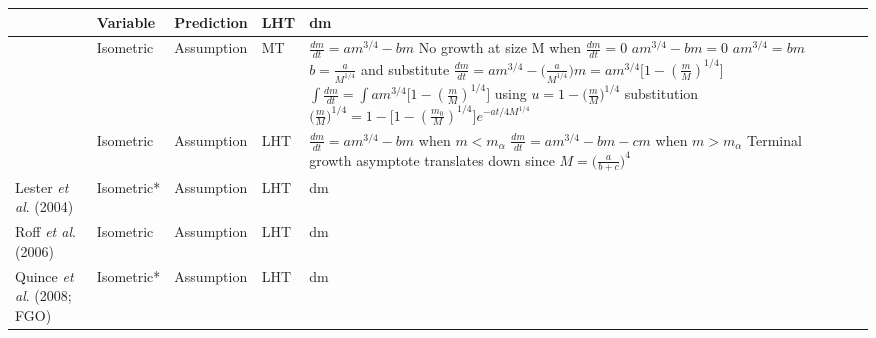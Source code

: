 \documentclass{article}
\begin{document}
\begin{table}[]
\begin{tabularx}{\textwidth}{|l|l|l|l|X|X|}
    \cite{kozlowski1996}                        & Variable         & Prediction         & LHT                   & dm                                                                                                                                                    \\ \hline
    \cite{West2001}                         & Isometric        & Assumption         & MT                    & \makecell[l]{$\frac{dm}{dt} = am^{3/4} - bm$ \\ No growth at size M when $\frac{dm}{dt} = 0 $ \\ $am^{3/4} - bm = 0 $ \\ $am^{3/4} = bm$ \\ $b = \frac{a}{M^{1/4}}$ and substitute \\ $\frac{dm}{dt} = am^{3/4} - \Big(\frac{a}{M^{1/4}}\Big)m = am^{3/4}\Big[1 - (\frac{m}{M})^{1/4}\Big]$ \\ $\int\frac{dm}{dt} = \int am^{3/4}\Big[1 - (\frac{m}{M})^{1/4}\Big]$ using $u = 1 - \big(\frac{m}{M}\big)^{1/4}$ substitution\\ $\big(\frac{m}{M}\big)^{1/4} = 1 - \bigg[1 - \left(\frac{m_0}{M}\right)^{1/4}\bigg]e^{-at/4M^{1/4}}$} \\ \hline
    \cite{Charnov2001}                      & Isometric        & Assumption         & LHT                   & \makecell[l]{$\frac{dm}{dt} = am^{3/4} - bm$ when $m < m_\alpha$ \\ $\frac{dm}{dt} = am^{3/4} - bm - cm$ when $m > m_\alpha$ \\ Terminal growth asymptote translates down since $M = \Big(\frac{a}{b+c}\Big)^4$}                                                                                                                                                    \\ \hline
    \cite{Charnov2004}
    Lester \textit{et al}. (2004)           & Isometric*       & Assumption         & LHT                   & dm                                                                                                                                                    \\ \hline
    Roff \textit{et al}. (2006)             & Isometric        & Assumption         & LHT                   & dm                                                                                                                                                    \\ \hline
    Quince \textit{et al}. (2008; FGO)      & Isometric*       & Assumption         & LHT                   & dm                                                                                                                                                    \\ \hline

\end{tabularx}
\end{table}
\end{document}
